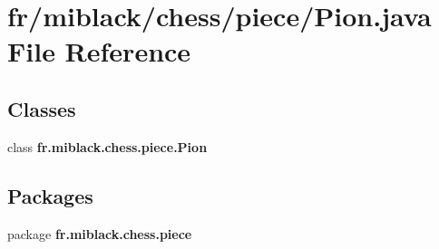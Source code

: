 \section{fr/miblack/chess/piece/\-Pion.java File Reference}
\label{Pion_8java}
\subsection*{Classes}
\begin{DoxyCompactItemize}
\item 
class {\bf fr.\-miblack.\-chess.\-piece.\-Pion}
\end{DoxyCompactItemize}
\subsection*{Packages}
\begin{DoxyCompactItemize}
\item 
package {\bf fr.\-miblack.\-chess.\-piece}
\end{DoxyCompactItemize}
